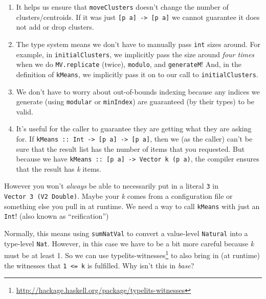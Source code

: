 \documentclass[]{article}
\renewcommand{\href}[2]{#2\footnote{\url{#1}}}
\begin{document}
\begin{enumerate}
\def\labelenumi{\arabic{enumi}.}
\tightlist
\item
  It helps us ensure that \texttt{moveClusters} doesn't change the number of
  clusters/centroids. If it was just
  \texttt{{[}p\ a{]}\ -\textgreater{}\ {[}p\ a{]}} we cannot guarantee it does
  not add or drop clusters.
\item
  The type system means we don't have to manually pass \texttt{int} sizes
  around. For example, in \texttt{initialClusters}, we implicitly pass the size
  around \emph{four times} when we do \texttt{MV.replicate} (twice),
  \texttt{modulo}, and \texttt{generateM}! And, in the definition of
  \texttt{kMeans}, we implicitly pass it on to our call to
  \texttt{initialClusters}.
\item
  We don't have to worry about out-of-bounds indexing because any indices we
  generate (using \texttt{modular} or \texttt{minIndex}) are guaranteed (by
  their types) to be valid.
\item
  It's useful for the caller to guarantee they are getting what they are asking
  for. If
  \texttt{kMeans\ ::\ Int\ -\textgreater{}\ {[}p\ a{]}\ -\textgreater{}\ {[}p\ a{]}},
  then we (as the caller) can't be sure that the result list has the number of
  items that you requested. But because we have
  \texttt{kMeans\ ::\ {[}p\ a{]}\ -\textgreater{}\ Vector\ k\ (p\ a)}, the
  compiler ensures that the result has \emph{k} items.
\end{enumerate}

However you won't \emph{always} be able to necessarily put in a literal
\texttt{3} in \texttt{Vector\ 3\ (V2\ Double)}. Maybe your \emph{k} comes from a
configuration file or something else you pull in at runtime. We need a way to
call \texttt{kMeans} with just an \texttt{Int}! (also known as ``reification'')

Normally, this means using \texttt{sumNatVal} to convert a value-level
\texttt{Natural} into a type-level \texttt{Nat}. However, in this case we have
to be a bit more careful because \emph{k} must be at least 1. So we can use
\href{http://hackage.haskell.org/package/typelits-witnesses}{typelits-witnesses}
to also bring in (at runtime) the witnesses that \texttt{1\ \textless{}=\ k} is
fulfilled. Why isn't this in \emph{base}?
\end{document}
